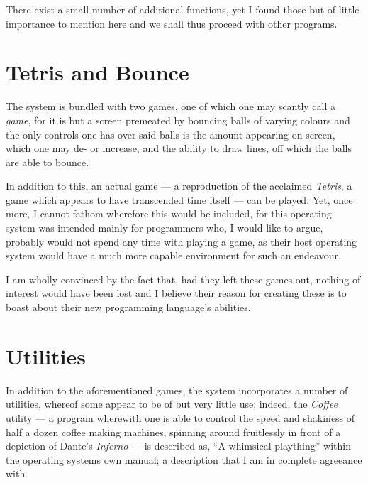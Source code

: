 \documentclass[a5paper,twoside,12pt]{report}
\begin{document}
    There exist a small number of additional functions, yet I found those but of little importance to mention here and we shall thus proceed with other programs.

    \section*{Tetris and Bounce}

    The system is bundled with two games, one of which one may scantly call a \textit{game}, for it is but a screen premeated by bouncing balls of varying colours and the only controls one has over said balls is the amount appearing on screen, which one may de- or increase, and the ability to draw lines, off which the balls are able to bounce.


    In addition to this, an actual game — a reproduction of the acclaimed \textit{Tetris}, a game which appears to have transcended time itself — can be played. Yet, once more, I cannot fathom wherefore this would be included, for this operating system was intended mainly for programmers who, I would like to argue, probably would not spend any time with playing a game, as their host operating system would have a much more capable environment for such an endeavour. 

    I am wholly convinced by the fact that, had they left these games out, nothing of interest would have been lost and I believe their reason for creating these is to boast about their new programming language's abilities.

    \section*{Utilities}

    In addition to the aforementioned games, the system incorporates a number of utilities, whereof some appear to be of but very little use; indeed, the \textit{Coffee} utility — a program wherewith one is able to control the speed and shakiness of half a dozen coffee making machines, spinning around fruitlessly in front of a depiction of Dante's \textit{Inferno} — is described as, ``A whimsical plaything'' within the operating systems own manual; a description that I am in complete agreeance with.
    
\end{document}
